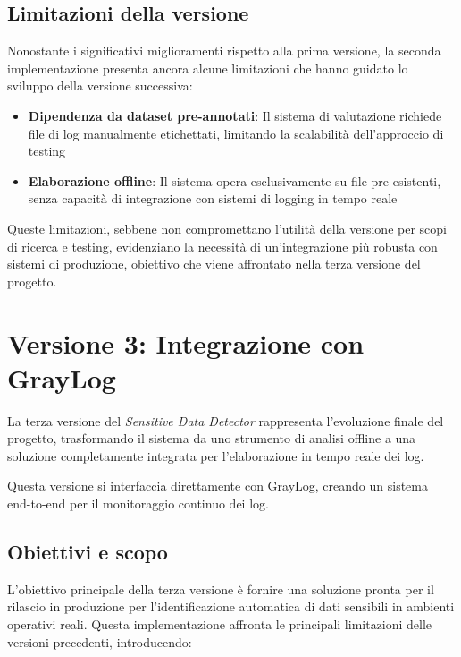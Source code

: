 \documentclass[12pt]{report}
\begin{document}
\subsection{Limitazioni della versione}
\label{subsec:ver2_limitazioni}

Nonostante i significativi miglioramenti rispetto alla prima versione, la seconda implementazione presenta ancora alcune limitazioni che hanno guidato lo sviluppo della versione successiva:

\begin{itemize}
    \item \textbf{Dipendenza da dataset pre-annotati}: Il sistema di valutazione richiede file di log manualmente etichettati, limitando la scalabilità dell'approccio di testing
    \item \textbf{Elaborazione offline}: Il sistema opera esclusivamente su file pre-esistenti, senza capacità di integrazione con sistemi di logging in tempo reale
\end{itemize}

Queste limitazioni, sebbene non compromettano l'utilità della versione per scopi di ricerca e testing, evidenziano la necessità di un'integrazione più robusta con sistemi di produzione, obiettivo che viene affrontato nella terza versione del progetto.

\section{Versione 3: Integrazione con GrayLog}
\label{sec:ver3}

La terza versione del \textit{Sensitive Data Detector} rappresenta l'evoluzione finale del progetto, trasformando il sistema da uno strumento di analisi offline a una soluzione completamente integrata per l'elaborazione in tempo reale dei log.

Questa versione si interfaccia direttamente con GrayLog, creando un sistema \\
end-to-end per il monitoraggio continuo dei log.

\subsection{Obiettivi e scopo}
\label{subsec:ver3_obiettivi}

L'obiettivo principale della terza versione è fornire una soluzione pronta per il rilascio in produzione per l'identificazione automatica di dati sensibili in ambienti operativi reali. Questa implementazione affronta le principali limitazioni delle versioni precedenti, introducendo:
\end{document}
